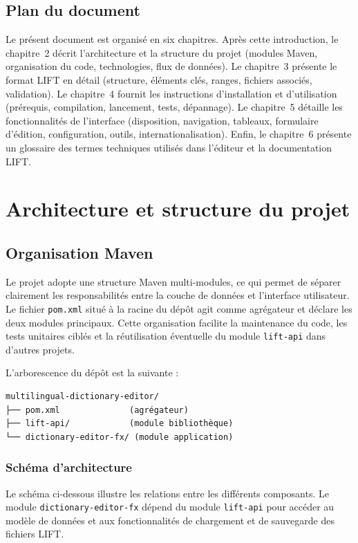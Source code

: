 \documentclass[11pt,twoside,openany]{book}
\begin{document}
\section{Plan du document}

Le présent document est organisé en six chapitres. Après cette introduction, le chapitre~2 décrit l'architecture et la structure du projet (modules Maven, organisation du code, technologies, flux de données). Le chapitre~3 présente le format LIFT en détail (structure, éléments clés, ranges, fichiers associés, validation). Le chapitre~4 fournit les instructions d'installation et d'utilisation (prérequis, compilation, lancement, tests, dépannage). Le chapitre~5 détaille les fonctionnalités de l'interface (disposition, navigation, tableaux, formulaire d'édition, configuration, outils, internationalisation). Enfin, le chapitre~6 présente un glossaire des termes techniques utilisés dans l'éditeur et la documentation LIFT.


\chapter{Architecture et structure du projet}

\section{Organisation Maven}

Le projet adopte une structure Maven multi-modules, ce qui permet de séparer clairement les responsabilités entre la couche de données et l'interface utilisateur. Le fichier \texttt{pom.xml} situé à la racine du dépôt agit comme agrégateur et déclare les deux modules principaux. Cette organisation facilite la maintenance du code, les tests unitaires ciblés et la réutilisation éventuelle du module \texttt{lift-api} dans d'autres projets.

L'arborescence du dépôt est la suivante :

\begin{verbatim}
multilingual-dictionary-editor/
├── pom.xml              (agrégateur)
├── lift-api/            (module bibliothèque)
└── dictionary-editor-fx/ (module application)
\end{verbatim}

\subsection{Schéma d'architecture}

Le schéma ci-dessous illustre les relations entre les différents composants. Le module \texttt{dictionary-editor-fx} dépend du module \texttt{lift-api} pour accéder au modèle de données et aux fonctionnalités de chargement et de sauvegarde des fichiers LIFT.
\end{document}
